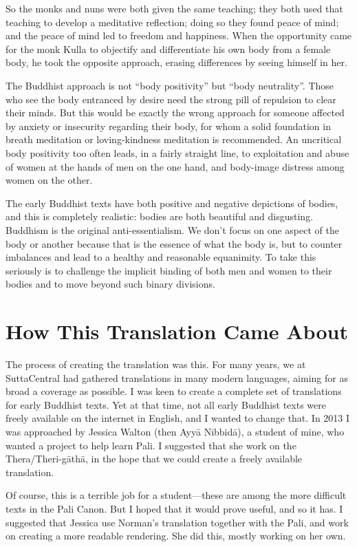 \documentclass[12pt,openany]{book}%
\begin{document}
So the monks and nuns were both given the same teaching; they both used that teaching to develop a meditative reflection; doing so they found peace of mind; and the peace of mind led to freedom and happiness. When the opportunity came for the monk Kulla to objectify and differentiate his own body from a female body, he took the opposite approach, erasing differences by seeing himself in her.

The Buddhist approach is not “body positivity” but “body neutrality”. Those who see the body entranced by desire need the strong pill of repulsion to clear their minds. But this would be exactly the wrong approach for someone affected by anxiety or insecurity regarding their body, for whom a solid foundation in breath meditation or loving-kindness meditation is recommended. An uncritical body positivity too often leads, in a fairly straight line, to exploitation and abuse of women at the hands of men on the one hand, and body-image distress among women on the other.  

The early Buddhist texts have both positive and negative depictions of bodies, and this is completely realistic: bodies are both beautiful and disgusting. Buddhism is the original anti-essentialism. We don’t focus on one aspect of the body or another because that is the essence of what the body is, but to counter imbalances and lead to a healthy and reasonable equanimity. To take this seriously is to challenge the implicit binding of both men and women to their bodies and to move beyond such binary divisions. 

\section*{How This Translation Came About}

The process of creating the translation was this. For many years, we at SuttaCentral had gathered translations in many modern languages, aiming for as broad a coverage as possible. I was keen to create a complete set of translations for early Buddhist texts. Yet at that time, not all early Buddhist texts were freely available on the internet in English, and I wanted to change that. In 2013 I was approached by Jessica Walton (then \textsanskrit{Ayyā} \textsanskrit{Nibbidā}), a student of mine, who wanted a project to help learn Pali. I suggested that she work on the Thera/Theri-\textsanskrit{gāthā}, in the hope that we could create a freely available translation.

Of course, this is a terrible job for a student—these are among the more difficult texts in the Pali Canon. But I hoped that it would prove useful, and so it has. I suggested that Jessica use Norman’s translation together with the Pali, and work on creating a more readable rendering. She did this, mostly working on her own.
\end{document}
